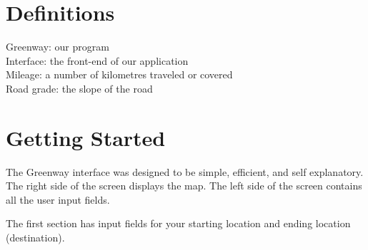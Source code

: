 \documentclass[12pt, titlepage]{article}
\begin{document}
\section{Definitions}
Greenway: our program\\
Interface: the front-end of our application\\
Mileage: a number of kilometres traveled or covered\\
Road grade: the slope of the road\\


\section{Getting Started}

The Greenway interface was designed to be simple, efficient, and self explanatory. The right side of the screen displays the map. The left side of the screen contains all the user input fields. 

\begin{center}
\end{center}

The first section has input fields for your starting location and ending location (destination). 

\begin{center}
\end{center}
\end{document}
